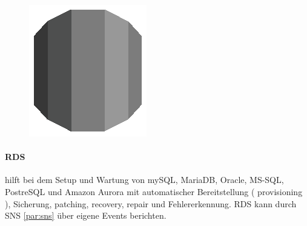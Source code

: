 \documentclass[
12pt,
english,
ngerman,
headsepline,
twoside,
openright,
numbers=noenddot,version=first
]{scrreprt}
\begin{document}
\begin{figure}
	\includegraphics[width=0.9\linewidth]{./pics/aws/Database_GRAYSCALE_AmazonRDS.eps}
\end{figure}
\paragraph{\acrfull{RDS}} hilft bei dem Setup und Wartung von mySQL, MariaDB, Oracle, MS-SQL, PostreSQL und Amazon Aurora mit automatischer Bereitstellung ( provisioning ), Sicherung, patching, recovery, repair und Fehlererkennung. \acrshort{RDS} kann durch \acrshort{SNS} \ref{par:sns} über eigene Events berichten.
\end{document}
